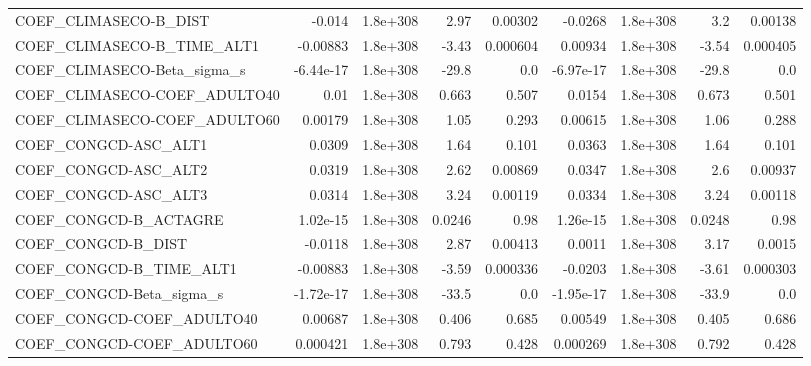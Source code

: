 \begin{tabular}{lrrrrrrrr}
COEF\_CLIMASECO-B\_DIST             &      -0.014 &     1.8e+308 &      2.97 &  0.00302 &    -0.0268 &    1.8e+308 &          3.2 &       0.00138 \\
COEF\_CLIMASECO-B\_TIME\_ALT1        &    -0.00883 &     1.8e+308 &     -3.43 & 0.000604 &    0.00934 &    1.8e+308 &        -3.54 &      0.000405 \\
COEF\_CLIMASECO-Beta\_sigma\_s       &   -6.44e-17 &     1.8e+308 &     -29.8 &      0.0 &  -6.97e-17 &    1.8e+308 &        -29.8 &           0.0 \\
COEF\_CLIMASECO-COEF\_ADULTO40      &        0.01 &     1.8e+308 &     0.663 &    0.507 &     0.0154 &    1.8e+308 &        0.673 &         0.501 \\
COEF\_CLIMASECO-COEF\_ADULTO60      &     0.00179 &     1.8e+308 &      1.05 &    0.293 &    0.00615 &    1.8e+308 &         1.06 &         0.288 \\
COEF\_CONGCD-ASC\_ALT1              &      0.0309 &     1.8e+308 &      1.64 &    0.101 &     0.0363 &    1.8e+308 &         1.64 &         0.101 \\
COEF\_CONGCD-ASC\_ALT2              &      0.0319 &     1.8e+308 &      2.62 &  0.00869 &     0.0347 &    1.8e+308 &          2.6 &       0.00937 \\
COEF\_CONGCD-ASC\_ALT3              &      0.0314 &     1.8e+308 &      3.24 &  0.00119 &     0.0334 &    1.8e+308 &         3.24 &       0.00118 \\
COEF\_CONGCD-B\_ACTAGRE             &    1.02e-15 &     1.8e+308 &    0.0246 &     0.98 &   1.26e-15 &    1.8e+308 &       0.0248 &          0.98 \\
COEF\_CONGCD-B\_DIST                &     -0.0118 &     1.8e+308 &      2.87 &  0.00413 &     0.0011 &    1.8e+308 &         3.17 &        0.0015 \\
COEF\_CONGCD-B\_TIME\_ALT1           &    -0.00883 &     1.8e+308 &     -3.59 & 0.000336 &    -0.0203 &    1.8e+308 &        -3.61 &      0.000303 \\
COEF\_CONGCD-Beta\_sigma\_s          &   -1.72e-17 &     1.8e+308 &     -33.5 &      0.0 &  -1.95e-17 &    1.8e+308 &        -33.9 &           0.0 \\
COEF\_CONGCD-COEF\_ADULTO40         &     0.00687 &     1.8e+308 &     0.406 &    0.685 &    0.00549 &    1.8e+308 &        0.405 &         0.686 \\
COEF\_CONGCD-COEF\_ADULTO60         &    0.000421 &     1.8e+308 &     0.793 &    0.428 &   0.000269 &    1.8e+308 &        0.792 &         0.428 \\

\end{tabular}
